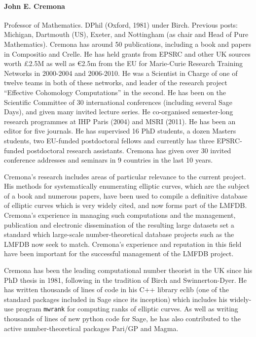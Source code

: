 \paragraph{John E. Cremona}
Professor of Mathematics.  DPhil (Oxford, 1981) under Birch.  Previous
posts: Michigan, Dartmouth (US), Exeter, and Nottingham (as chair and
Head of Pure Mathematics). Cremona has around 50 publications,
including a book and papers in Compositio and Crelle.  He has held
grants from EPSRC and other UK sources worth \pounds2.5M as well as
\euro2.5m from the EU for Marie-Curie Research Training Networks in
2000-2004 and 2006-2010.  He was a Scientist in Charge of one of
twelve teams in both of these networks, and leader of the research
project ``Effective Cohomology Computations'' in the second.  He has
been on the Scientific Committee of 30 international conferences
(including several Sage Days), and given many invited lecture series.
He co-organised semester-long research programmes at IHP Paris (2004)
and MSRI (2011).  He has been an editor for five journals.  He has
supervised 16 PhD students, a dozen Masters students, two EU-funded
postdoctoral fellows and currently has three EPSRC-funded postdoctoral
research assistants.  Cremona has given over 30 invited conference
addresses and seminars in 9 countries in the last 10 years.

Cremona's research includes areas of particular relevance to the
current project.  His methods for systematically enumerating elliptic
curves, which are the subject of a book and numerous papers, have been
used to compile a definitive database of elliptic curves which is very
widely cited, and now forms part of the LMFDB.  Cremona's experience
in managing such computations and the management, publication and
electronic dissemination of the resulting large datasets set a
standard which large-scale number-theoretical database projects such
as the LMFDB now seek to match.  Cremona's experience and reputation
in this field have been important for the successful management of the
LMFDB project.

Cremona has been the leading computational number theorist in the UK
since his PhD thesis in 1981, following in the tradition of Birch and
Swinnerton-Dyer.  He has written thousands of lines of code in his C++
library eclib (one of the standard packages included in Sage since its
inception) which includes his widely-use program {\tt mwrank} for
computing ranks of elliptic curves.  As well as writing thousands of
lines of new python code for Sage, he has also contributed to the
active number-theoretical packages Pari/GP and Magma.
